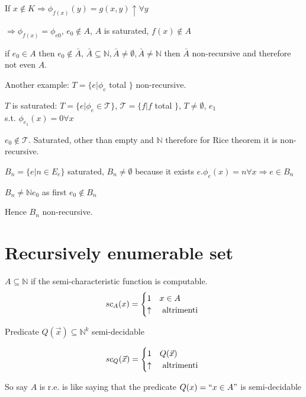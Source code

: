 \documentclass{amsbook}
\newcommand{\nat}{\ensuremath{\mathbb{N}}}
\theoremstyle{definition}
\theoremstyle{remark}
\numberwithin{section}{chapter}
\numberwithin{equation}{chapter}
\begin{document}
If $ x \not\in K \Rightarrow \phi_{f(x)}(y) = g(x,y) \uparrow \forall y $

$ \Rightarrow \phi_{f(x)} = \phi_{e0} $, $ e_0 \not\in A $, $A$ is saturated, $ f(x)\not\in A $

if $ e_0 \in A $ then $ e_0 \not \in \bar{A} $, $ \bar{A} \subseteq \nat, \bar{A} \not= \emptyset, \bar{A}\not=\nat $ then $ \bar{A} $ non-recursive and therefore not even $A$.


Another example: $ T = \{e | \phi_e $ total $ \} $ non-recursive.

$T$ is saturated: $ T = \{e | \phi_e \in \mathcal{T} \} $, $ \mathcal{T} = \{f | f $ total $ \} $, $ T\not=\emptyset $, $ e_1 $\\ s.t. $ \phi_{e_1}(x) = 0 \forall x $

$ e_0 \not\in \mathcal{T} $. Saturated, other than empty and $ \nat $ therefore for Rice theorem it is non-recursive.

$ B_n = \{e | n \in E_e \} $ saturated, $ B_n \not= \emptyset $ because it exists $ e. \phi_e(x) = n \forall x \Rightarrow e \in B_n $

$ B_n \not= \nat e_0$ as first $ e_0 \not\in B_n $

Hence $ B_n $ non-recursive.

\chapter {Recursively enumerable set}

$ A \subseteq \nat $ if the semi-characteristic function is computable.
\begin{equation*}
	sc_A(x) = \begin{cases}
		1        & x \in A        \\
		\uparrow & $ altrimenti $
	\end{cases}
\end{equation*}

Predicate $ Q(\vec{x}) \subseteq \nat^k $ semi-decidable

\begin{equation*}
	sc_Q(\vec{x}) = \begin{cases}
		1        & Q(\vec{x})     \\
		\uparrow & $ altrimenti $
	\end{cases}
\end{equation*}

So say $A$ is r.e. is like saying that the predicate $ Q(x)=``x \in A" $ is semi-decidable
\end{document}
